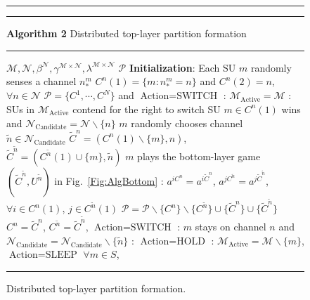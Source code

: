 \documentclass[journal,draftclsnofoot,onecolumn]{IEEEtran}
\theoremstyle{definition}
\def\Extra{0.5ex}
\def\Extra{0.5ex}
\begin{document}
\renewcommand{\algorithmicrequire}{\textbf{Input:}}
\renewcommand{\algorithmicensure}{\textbf{Output:}}
\begin{figure}[!t]
\hrule\hrule\vspace{\Extra}
\textbf{Algorithm 2} Distributed top-layer partition formation
\vspace{\Extra}
\hrule
\begin{algorithmic}[1]
\Require $\mathcal{M},\mathcal{N},\beta^\mathcal{N},\gamma^{\mathcal{M}\times \mathcal{N}},\lambda^{\mathcal{M}\times \mathcal{N}}$
\Ensure $\mathcal{P}$
\State \textbf{Initialization}: Each SU $m$ randomly senses a channel $n_*^m$
\State $C^n(1)=\{m:n_*^m=n\}$ and $C^n(2)=n$, $\forall n\in \mathcal{N}$
\State $\mathcal{P}=\{C^1,\cdots, C^N\}$ and $\textrm{Action}=\textrm{SWITCH}$
\label{Line:While}
: {$\mathcal{M}_\mathrm{Active}=\mathcal{M}$}
\EndIf
{}:
\State SUs in $\mathcal{M}_\mathrm{Active}$ contend for the right to switch
\State SU $m\in C^n(1)$ wins and $\mathcal{N}_\mathrm{Candidate}=\mathcal{N}\backslash \{n\}$
\EndIf
\State $m$ randomly chooses channel ${\tilde{n}}\in\mathcal{N}_\mathrm{Candidate}$
\State $\tilde{C}^n=(C^n(1)\backslash \{m\},n)$, $\tilde{C}^{\tilde{n}}=(C^{\tilde{n}}(1){\cup}\{m\},\tilde{n})$
\State $m$ plays the bottom-layer game $(\tilde{C}^{\tilde{n}},U^{\tilde{n}})$ in Fig.~\ref{Fig:AlgBottom}\label{Line:Play}
:\label{Line:CheckPrefer}
\State $a^{iC^n}=a^{i\tilde{C}^n}$, $a^{jC^{\tilde{n}}}=a^{j\tilde{C}^{\tilde{n}}}$,  $\forall i\in C^n(1)$, $j\in C^{\tilde{n}}(1)$
\State  $\mathcal{P}=\mathcal{P} \backslash\{C^n\}\backslash\{C^{\tilde{n}}\}\cup\{{ \tilde{C}^n}\}\cup \{ \tilde{C}^{\tilde{n}}\}$\State $C^n=\tilde{C}^n$, $C^{\tilde{n}}= \tilde{C}^{\tilde{n}}$,  $\textrm{Action}=\textrm{SWITCH}$
\Else :
\State $m$ stays on channel $n$ and $\mathcal{N}_\mathrm{Candidate}=\mathcal{N}_\mathrm{Candidate}\backslash \{\tilde{n}\}$
: {$\textrm{Action}=\textrm{HOLD}$}
\Else : {$\mathcal{M}_\mathrm{Active}=\mathcal{M}\backslash \{m\}$, $\textrm{Action}=\textrm{SLEEP}$}
\EndIf
\EndIf
{} $\forall m\in S$,
\EndIf
\EndWhile\label{Line:Converge}
\end{algorithmic}
\hrule
\caption{Distributed top-layer partition formation.}
\label{Fig:AlgTop}
\end{figure}
\end{document}

